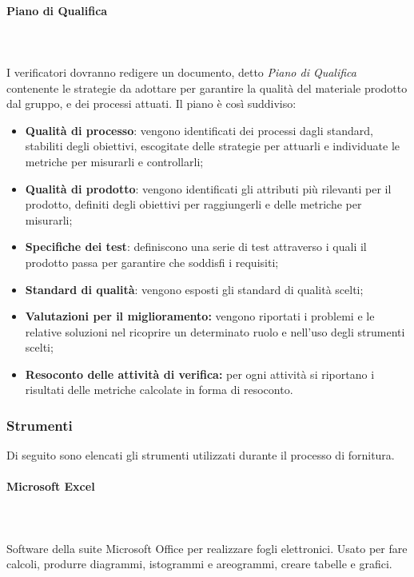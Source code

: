 		\paragraph{Piano di Qualifica} \mbox{}\\ \mbox{}\\
		I verificatori dovranno redigere un documento, detto \textit{Piano di Qualifica} contenente le strategie da adottare per garantire la qualità del materiale prodotto dal gruppo, e dei processi attuati. Il piano è così suddiviso:
		\begin{itemize}
			\item \textbf{Qualità di processo}: vengono identificati dei processi dagli standard, stabiliti degli obiettivi, escogitate delle strategie per attuarli e individuate le metriche per misurarli e controllarli;
			\item \textbf{Qualità di prodotto}: vengono identificati gli attributi più rilevanti per il prodotto, definiti degli obiettivi per raggiungerli e delle metriche per misurarli;
			\item \textbf{Specifiche dei test}: definiscono una serie di test attraverso i quali il prodotto passa per garantire che soddisfi i requisiti;
			\item \textbf{Standard di qualità}: vengono esposti gli standard di qualità scelti;
			\item \textbf{Valutazioni per il miglioramento:} vengono riportati i problemi e le relative soluzioni nel ricoprire un determinato ruolo e nell'uso degli strumenti scelti;
			\item \textbf{Resoconto delle attività di verifica:} per ogni attività si riportano i risultati delle metriche calcolate in forma di resoconto.
		\end{itemize}
		\subsubsection{Strumenti}
		Di seguito sono elencati gli strumenti utilizzati durante il processo di fornitura.
		\paragraph{Microsoft Excel} \mbox{}\\ \mbox{}\\
		Software della suite Microsoft Office per realizzare fogli elettronici. Usato per fare calcoli, produrre diagrammi, istogrammi e areogrammi, creare tabelle e grafici.
